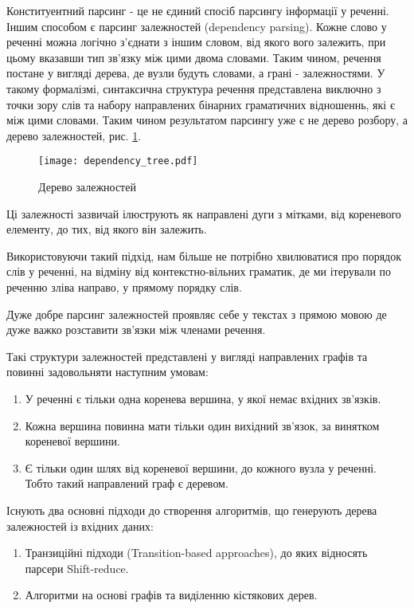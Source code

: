 Конституентний парсинг - це не єдиний спосіб парсингу інформації у реченні.
Іншим способом є парсинг залежностей (dependency parsing). Кожне слово у
реченні можна логічно з'єднати з іншим словом, від якого вого залежить,
при цьому вказавши тип зв'язку між цими двома словами. Таким чином, речення
постане у вигляді дерева, де вузли будуть словами, а грані - залежностями.
У такому формалізмі, синтаксична структура речення представлена
виключно з точки зору слів та набору направлених бінарних граматичних відношеннь,
які є між цими словами. Таким чином результатом парсингу уже є не дерево розбору,
а дерево залежностей, рис. \ref{img:dependency_tree}.
\begin{figure}[ht]
  \begin{center}
    \texttt{[image: dependency\_tree.pdf]}
  \end{center}
  \caption{Дерево залежностей}
  \label{img:dependency_tree}
\end{figure}

Ці залежності зазвичай ілюструють як направлені дуги з мітками, від кореневого
елементу, до тих, від якого він залежить.

Використовуючи такий підхід, нам більше не потрібно хвилюватися про
порядок слів у реченні, на відміну від контекстно-вільних граматик, де ми
ітерували по реченню зліва направо, у прямому порядку слів.

Дуже добре парсинг залежностей проявляє себе у текстах з прямою мовою
де дуже важко розставити зв'язки між членами речення.

Такі структури залежностей представлені у вигляді направлених графів та
повинні задовольняти наступним умовам:
\begin{enumerate}
    \item У реченні є тільки одна коренева вершина, у якої немає вхідних зв'язків.
    \item Кожна вершина повинна мати тільки один вихідний зв'язок, за
    винятком кореневої вершини.
    \item Є тільки один шлях від кореневої вершини, до кожного
    вузла у реченні. Тобто такий направлений граф є деревом.
\end{enumerate}

Існують два основні підходи до створення алгоритмів, що генерують дерева
залежностей із вхідних даних:
\begin{enumerate}
    \item Транзиційні підходи (Transition-based approaches), до яких відносять парсери
    Shift-reduce.
    \item Алгоритми на основі графів та виділенню кістякових дерев.
\end{enumerate}

